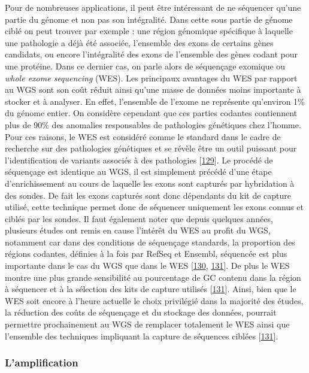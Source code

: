 \documentclass[12pt,a4paper,twoside]{ugathesis}
\theoremstyle{definition}
\theoremstyle{definition}
\theoremstyle{definition}
\theoremstyle{remark}
\begin{document}
Pour de nombreuses applications, il peut être intéressant de ne
séquencer qu'une partie du génome et non pas son intégralité. Dans cette
sous partie de génome ciblé on peut trouver par exemple : une région
génomique spécifique à laquelle une pathologie a déjà été associée,
l'ensemble des exons de certains gènes candidats, ou encore
l'intégralité des exons de l'ensemble des gènes codant pour une
protéine. Dans ce dernier cas, on parle alors de séquençage exomique ou
\emph{whole exome sequencing} (WES). Les principaux avantages du WES par
rapport au WGS sont son coût réduit ainsi qu'une masse de données moins
importante à stocker et à analyser. En effet, l'ensemble de l'exome ne
représente qu'environ 1\% du génome entier. On considère cependant que
ces parties codantes contiennent plus de 90\% des anomalies responsables
de pathologies génétiques chez l'homme. Pour ces raisons, le WES est
considéré comme le standard dans le cadre de recherche sur des
pathologies génétiques et se révèle être un outil puissant pour
l'identification de variants associés à des pathologies
{[}\protect\hyperlink{ref-Ng2010}{129}{]}. Le procédé de séquençage est
identique au WGS, il est simplement précédé d'une étape d'enrichissement
au cours de laquelle les exons sont capturés par hybridation à des
sondes. De fait les exons capturés sont donc dépendants du kit de
capture utilisé, cette technique permet donc de séquencer uniquement les
exons connus et ciblés par les sondes. Il faut également noter que
depuis quelques années, plusieurs études ont remis en cause l'intérêt du
WES au profit du WGS, notamment car dans des conditions de séquençage
standards, la proportion des régions codantes, définies à la fois par
RefSeq et Ensembl, séquencée est plus importante dans le cas du WGS que
dans le WES {[}\protect\hyperlink{ref-Lelieveld2015}{130},
\protect\hyperlink{ref-Meienberg2016}{131}{]}. De plus le WES montre une
plus grande sensibilité au pourcentage de GC contenu dans la région à
séquencer et à la sélection des kits de capture utilisés
{[}\protect\hyperlink{ref-Meienberg2016}{131}{]}. Ainsi, bien que le WES
soit encore à l'heure actuelle le choix privilégié dans la majorité des
études, la réduction des coûts de séquençage et du stockage des données,
pourrait permettre prochainement au WGS de remplacer totalement le WES
ainsi que l'ensemble des techniques impliquant la capture de séquences
ciblées {[}\protect\hyperlink{ref-Meienberg2016}{131}{]}.

\subsubsection{L'amplification}\label{lamplification}
\end{document}

